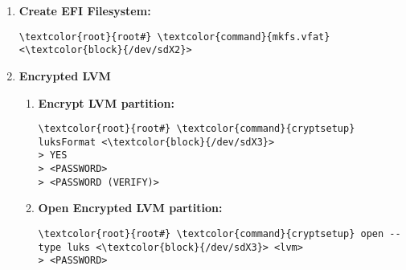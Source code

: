 \documentclass[10pt, a4paper, onecolumn, openany]{book} %
\begin{document}
\begin{enumerate}
\begin{enumerate}
        \item \textbf{Partition - EFI (>= 300MB -> 512MB):}
\begin{Verbatim}[commandchars=\\\{\}]
\textcolor{root}{(parted)} \textcolor{command}{mkpart} primary <2048s> <1050623s>
\textcolor{root}{(parted)} \textcolor{command}{name} 2 efi
\textcolor{root}{(parted)} \textcolor{command}{set} 2 boot on
\textcolor{root}{(parted)} \textcolor{command}{set} 2 esp on
\end{Verbatim}
        \item \textbf{Partition - LVM}
\begin{Verbatim}[commandchars=\\\{\}]
\textcolor{root}{(parted)} \textcolor{command}{mkpart} primary <1050624s> 100\%
\textcolor{root}{(parted)} \textcolor{command}{name} 3 lvm
\textcolor{root}{(parted)} \textcolor{command}{set} 3 lvm on
\end{Verbatim}
        \item \textbf{Quit parted:}
\begin{Verbatim}[commandchars=\\\{\}]
\textcolor{root}{(parted)} \textcolor{command}{(q)uit}
\end{Verbatim}
    \end{enumerate}

    \item \textbf{Create EFI Filesystem:}
\begin{Verbatim}[commandchars=\\\{\}]
\textcolor{root}{root#} \textcolor{command}{mkfs.vfat} <\textcolor{block}{/dev/sdX2}>
\end{Verbatim}

    \item \textbf{Encrypted LVM}
    \begin{enumerate}
        \item \textbf{Encrypt LVM partition:}
\begin{Verbatim}[commandchars=\\\{\}]
\textcolor{root}{root#} \textcolor{command}{cryptsetup} luksFormat <\textcolor{block}{/dev/sdX3}>
> YES
> <PASSWORD>
> <PASSWORD (VERIFY)>
\end{Verbatim}
        \item \textbf{Open Encrypted LVM partition:}
\begin{Verbatim}[commandchars=\\\{\}]
\textcolor{root}{root#} \textcolor{command}{cryptsetup} open --type luks <\textcolor{block}{/dev/sdX3}> <lvm>
> <PASSWORD>
\end{Verbatim}        
    \end{enumerate}


\end{enumerate}
\end{document}
